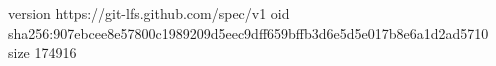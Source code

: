 version https://git-lfs.github.com/spec/v1
oid sha256:907ebcee8e57800c1989209d5eec9dff659bffb3d6e5d5e017b8e6a1d2ad5710
size 174916
